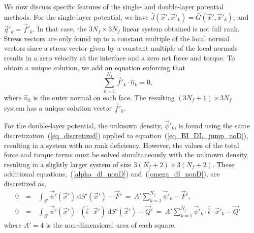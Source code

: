  \par
 We now discuss specific features of the single- and double-layer potential methods. For the single-layer potential, we have $\bar{\bar{J}}(\vec{x}',\vec{x}'_k) = \bar{\bar{G}}(\vec{x}',\vec{x}'_k)$, and $\vec{q}'_k = \vec{f}'_k$. 
 In that case, the $3N_f \times 3N_f$ linear system obtained is not full rank. Stress vectors are only found up to a constant multiple of the local normal vectors since a stress vector given by a constant multiple of the local normals results in a zero velocity at the interface and a zero net force and torque. To obtain a unique solution, we add an equation enforcing that
 \begin{equation}
 \sum_{k=1}^{N_f} \vec{f}'_k \cdot \hat{n}_k = 0,
 \label{eq_constraint}
 \end{equation}
 where $\hat{n}_k$ is the outer normal on each face. The resulting $(3N_f +1)\times 3N_f$ system has a unique solution vector $\vec{f}'_k$. 
 \par
 For the double-layer potential, the unknown density, $\vec{\psi}'_k$, is found using the same discretization~(\ref{eq_discretized}) applied to equation~(\ref{eq_BI_DL_jump_noD}), resulting in a system with no rank deficiency. However, the values of the total force and torque terms must be solved simultaneously with the unknown density, resulting in a slightly larger system of size $3(N_f+2)\times 3(N_f+2)$. These additional  equations,~(\ref{alpha_dl_nonD}) and~(\ref{omega_dl_nonD}), are discretized as,
 \begin{eqnarray}
 0 \ &=& \
 \int_{S'}  \vec{\psi}'( \vec{x}')  \ \text{d}S'(\vec{x}') -  \vec{F}' \ = \
A' \sum_{k=1}^{N_f} \vec{\psi}'_k   -  \vec{F}', \label{eq_disc_dlF} \\
0 \ &=& \
  \int_{S'}  \vec{\psi}' ( \vec{x}') \cdot  (\bar{\bar{\bar{\epsilon}}} \cdot \vec{x}' )  \ \text{d}S'(\vec{x}')
 - \vec{Q}'
\ = \
 A' \sum_{k=1}^{N_f} \vec{\psi}'_k   \cdot \bar{\bar{\bar{\epsilon}}}  \cdot  \vec{x}'_k   - \vec{Q}' \label{eq_disc_dlQ}
 \end{eqnarray}
where $A' = 4$ is the non-dimensional area of each square.
